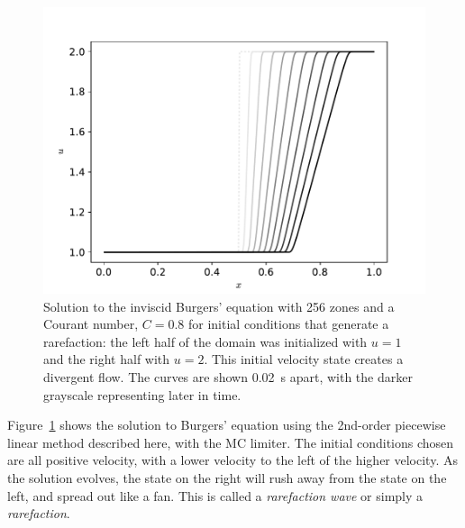 \begin{figure}[t]
\centering
\includegraphics[width=0.8\linewidth]{fv-burger-rarefaction}
\caption[Rarefaction solution to the inviscid Burgers'
  equation]{\label{fig:burgers-rarefaction} Solution to the inviscid
  Burgers' equation with 256 zones and a Courant number, $C = 0.8$ for
  initial conditions that generate a rarefaction: the left half of the
  domain was initialized with $u = 1$ and the right half with $u = 2$.
  This initial velocity state creates a divergent flow.  The curves
  are shown 0.02~s apart, with the darker grayscale representing later
  in
  time. \\ }
\end{figure}


Figure~\ref{fig:burgers-rarefaction} shows the solution to Burgers'
equation using the 2nd-order piecewise linear method described here,
with the MC limiter.  The initial conditions chosen are all positive
velocity, with a lower velocity to the left of the higher velocity.
As the solution evolves, the state on the right will rush away from
the state on the left, and spread out like a fan.  This is called a
{\em rarefaction wave} or simply a {\em rarefaction}.

